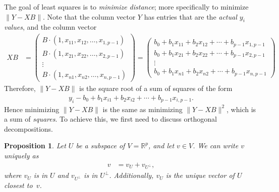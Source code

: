 \documentclass[a4paper, 12pt]{article}
\numberwithin{equation}{section}
\numberwithin{figure}{section}
\newtheorem{prop}[thm]{Proposition}
\theoremstyle{definition}
\newcommand{\R}{\mathbb{R}}
\begin{document}
The goal of least squares is to \textit{minimize distance}; more specifically to
minimize $\|Y - XB\|$. Note that the column vector $Y$ has entries that are the
\textit{actual $y_i$ values}, and the column vector 
\begin{align*}
	XB &= \begin{pmatrix}
		B\cdot (1, x_{11}, x_{12}, \dots, x_{1,p-1}) \\ 
		B\cdot (1, x_{21}, x_{22}, \dots, x_{2,p-1}) \\ 
		\vdots \\
		B\cdot (1, x_{n1}, x_{n2}, \dots, x_{n,p-1}) 
	\end{pmatrix} = \begin{pmatrix}
		b_0 + b_1x_{11} + b_2x_{12} + \cdots + b_{p-1}x_{1,p-1} \\ 
		b_0 + b_1x_{21} + b_2x_{22} + \cdots + b_{p-1}x_{2,p-1} \\ 
		\vdots \\
		b_0 + b_1x_{n1} + b_2x_{n2} + \cdots + b_{p-1}x_{n,p-1}
	\end{pmatrix}
\end{align*}
Therefore, $\| Y - XB \|$ is the square root of a sum of squares of the form 
\begin{align*}
	y_i - b_0 + b_1x_{i1} + b_2x_{i2} + \cdots + b_{p-1}x_{i,p-1}.
\end{align*}
Hence minimizing $\| Y - XB \|$ is the same as minimizing $\| Y - XB \|^2$,
which is a sum of \textit{squares}. To achieve this, we first need to discuss
orthogonal decompositions. 

\begin{prop}\label{prop:orthogonal-decomp}
	Let $U$ be a subspace of $V=\R^p$, and let $v\in V$. We can write $v$
	uniquely as 
	\begin{align*}
		v &= v_U + v_{U^{\perp}},
	\end{align*}
	where $v_U$ is in $U$ and $v_{U^{\perp}}$ is in $U^{\perp}$. Additionally,
	$v_U$ is the unique vector of $U$ closest to~$v$.
\end{prop}
\end{document}

